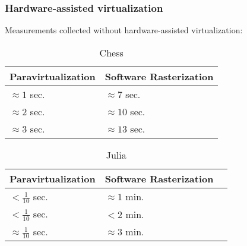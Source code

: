 \begin{frame}
\frametitle{Hardware-assisted virtualization}

\begin{center}
Measurements collected without hardware-assisted virtualization:
\end{center}

\begin{table}[]
\centering
\caption{Chess}
\begin{tabular}{ll}
\hline
Paravirtualization & Software Rasterization \\ \hline
$\approx 1$ sec. & $\approx 7$ sec. \\
$\approx 2$ sec. & $\approx 10$ sec. \\
$\approx 3$ sec. & $\approx 13$ sec. \\ \hline
\end{tabular}
\end{table}

\begin{table}[]
\centering
\caption{Julia}
\begin{tabular}{lll}
\hline
Paravirtualization & Software Rasterization \\ \hline
$<\frac{1}{10}$ sec. & $\approx 1$ min. \\
$<\frac{1}{10}$ sec. & $<2$ min. \\
$\approx \frac{1}{10}$ sec. & $\approx 3$ min. \\ \hline
\end{tabular}
\end{table}


\end{frame}
